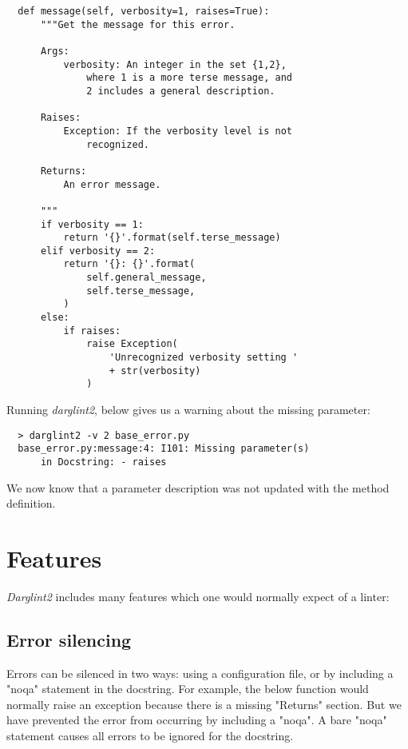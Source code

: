 \documentclass[landscape]{sciposter}
\begin{document}
\begin{multicols}{4}
\begin{verbatim}
  def message(self, verbosity=1, raises=True):
      """Get the message for this error.

      Args:
          verbosity: An integer in the set {1,2},
              where 1 is a more terse message, and
              2 includes a general description.

      Raises:
          Exception: If the verbosity level is not
              recognized.

      Returns:
          An error message.

      """
      if verbosity == 1:
          return '{}'.format(self.terse_message)
      elif verbosity == 2:
          return '{}: {}'.format(
              self.general_message,
              self.terse_message,
          )
      else:
          if raises:
              raise Exception(
                  'Unrecognized verbosity setting '
                  + str(verbosity)
              )
\end{verbatim}

            Running \textit{darglint2}, below gives us a warning about the missing
            parameter:

\begin{verbatim}
  > darglint2 -v 2 base_error.py
  base_error.py:message:4: I101: Missing parameter(s)
      in Docstring: - raises
\end{verbatim}

            We now know that a parameter description was not updated with
            the method definition. \\

    \section{Features}

        \textit{Darglint2} includes many features which one would normally expect
        of a linter:

        \subsection{Error silencing}
            Errors can be silenced in two ways: using a configuration file,
            or by including a "noqa" statement in the docstring.  For example,
            the below function would normally raise an exception because
            there is a missing "Returns" section.  But we have prevented the
            error from occurring by including a "noqa".  A bare "noqa"
            statement causes all errors to be ignored for the docstring.


\end{multicols}
\end{document}
